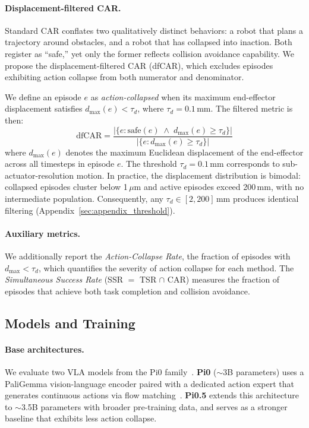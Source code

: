 \paragraph{Displacement-filtered CAR.} Standard CAR conflates two qualitatively distinct behaviors: a robot that plans a trajectory around obstacles, and a robot that has collapsed into inaction. Both register as ``safe,'' yet only the former reflects collision avoidance capability. We propose the displacement-filtered CAR (dfCAR), which excludes episodes exhibiting action collapse from both numerator and denominator.

We define an episode $e$ as \emph{action-collapsed} when its maximum end-effector displacement satisfies $d_{\max}(e) < \tau_d$, where $\tau_d = 0.1$\,mm. The filtered metric is then:
\begin{equation}\label{eq:car_f}
\text{dfCAR} = \frac{|\{e : \text{safe}(e) \;\land\; d_{\max}(e) \geq \tau_d\}|}{|\{e : d_{\max}(e) \geq \tau_d\}|}
\end{equation}
where $d_{\max}(e)$ denotes the maximum Euclidean displacement of the end-effector across all timesteps in episode $e$. The threshold $\tau_d = 0.1$\,mm corresponds to sub-actuator-resolution motion. In practice, the displacement distribution is bimodal: collapsed episodes cluster below 1\,$\mu$m and active episodes exceed 200\,mm, with no intermediate population. Consequently, any $\tau_d \in [2, 200]$\,mm produces identical filtering (Appendix~\ref{sec:appendix_threshold}).

\paragraph{Auxiliary metrics.} We additionally report the \emph{Action-Collapse Rate}, the fraction of episodes with $d_{\max} < \tau_d$, which quantifies the severity of action collapse for each method. The \emph{Simultaneous Success Rate} (SSR $= $ TSR $\cap$ CAR) measures the fraction of episodes that achieve both task completion and collision avoidance.

\subsection{Models and Training}

\paragraph{Base architectures.} We evaluate two VLA models from the Pi0 family~\cite{black2024pi0}. \textbf{Pi0} (${\sim}$3B parameters) uses a PaliGemma vision-language encoder paired with a dedicated action expert that generates continuous actions via flow matching~\cite{lipman2023flow}. \textbf{Pi0.5} extends this architecture to ${\sim}$3.5B parameters with broader pre-training data, and serves as a stronger baseline that exhibits less action collapse.

